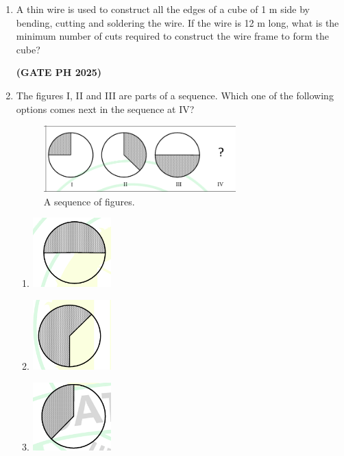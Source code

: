 \documentclass[14pt, a4paper]{extarticle}
\begin{document}
\begin{enumerate}[label=\textbf{Q.\arabic*}]
\item A thin wire is used to construct all the edges of a cube of 1 m side by bending, cutting and soldering the wire. If the wire is 12 m long, what is the minimum number of cuts required to construct the wire frame to form the cube?
\begin{enumerate}
\end{enumerate}
\hfill \textbf{(GATE PH 2025)}

\item The figures I, II and III are parts of a sequence. Which one of the following options comes next in the sequence at IV?
\begin{figure}[H]
\centering
\includegraphics[width=0.7\textwidth]{figs/q3fig25.png}
\caption{A sequence of figures.}
\label{fig:q5_sequence}
\end{figure}
\begin{enumerate}
\item \includegraphics[width=0.25\textwidth]{figs/q3figa25.png}
\item \includegraphics[width=0.25\textwidth]{figs/q3figb25.png}
\item \includegraphics[width=0.25\textwidth]{figs/q3figc25.png}

\end{enumerate}
\end{enumerate}
\end{document}
